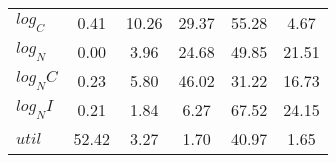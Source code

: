 \begin{center}
\begin{longtable}{lccccc}
$log_C         $	 & 	        0.41	 & 	       10.26	 & 	       29.37	 & 	       55.28	 & 	        4.67 \\ 
$log_N         $	 & 	        0.00	 & 	        3.96	 & 	       24.68	 & 	       49.85	 & 	       21.51 \\ 
$log_NC        $	 & 	        0.23	 & 	        5.80	 & 	       46.02	 & 	       31.22	 & 	       16.73 \\ 
$log_NI        $	 & 	        0.21	 & 	        1.84	 & 	        6.27	 & 	       67.52	 & 	       24.15 \\ 
$util          $	 & 	       52.42	 & 	        3.27	 & 	        1.70	 & 	       40.97	 & 	        1.65 \\ 
\end{longtable}
 \end{center}
